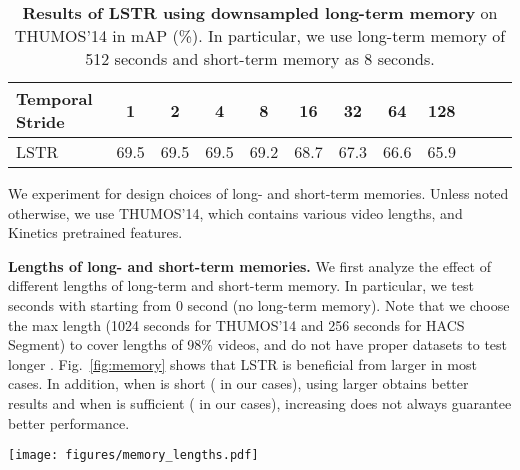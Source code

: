 \begin{table}[!htp]
\vspace{-3mm}
    \caption{
        \textbf{Results of LSTR using downsampled long-term memory} on THUMOS'14 in mAP (\%).
        In particular, we use long-term memory of 512 seconds and short-term memory as 8 seconds.
    }
    \vspace{3pt}
    \begin{minipage}{1.0\linewidth}
        \centering
        \footnotesize
        \begin{tabular}{lccccccccccc}
            \toprule
            Temporal Stride & 1 & 2 & 4 & 8 & 16 & 32 & 64 & 128 \\
            \midrule
            LSTR \quad\quad\quad\quad\quad\quad\quad
            & 69.5 & 69.5 & 69.5 & 69.2 & 68.7 & 67.3 & 66.6 & 65.9 \\
            \bottomrule
        \end{tabular}
    \end{minipage}
    \vspace{-5pt}
    \label{table:memory}
\end{table}


 
We experiment for design choices of long- and short-term memories.
Unless noted otherwise, we use THUMOS'14, which contains various video lengths, and Kinetics pretrained features.

\textbf{Lengths of long- and short-term memories.}
We first analyze the effect of different lengths of long-term  and short-term  memory.
In particular, we test  seconds with  starting from 0 second (no long-term memory).
Note that we choose the max length (1024 seconds for THUMOS'14 and 256 seconds for HACS Segment) to cover lengths of 98\% videos, and do not have proper datasets to test longer .
Fig.~\ref{fig:memory} shows that LSTR is beneficial from larger  in most cases.
In addition, when  is short ( in our cases), using larger  obtains better results and when  is sufficient ( in our cases), increasing  does not always guarantee better performance.

\vspace{-3mm}
\begin{figure*}[!htp]
    \begin{center}
        \texttt{[image: figures/memory\_lengths.pdf]}
    \end{center}
    \vspace{-6mm}
    \caption{
        {\textbf{Effect of using different lengths of long- and short-term memories}.}
    }
    \vspace{-3mm}
    \label{fig:memory}
\end{figure*}

